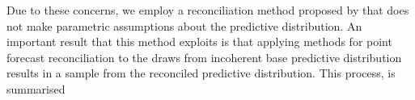 \documentclass[graybox]{svmult}
\begin{document}


Due to these concerns, we employ a reconciliation method proposed by \cite{GamEtAl2018} that does not make parametric assumptions about the predictive distribution.  An important result that this method exploits is that applying methods for point forecast reconciliation to the draws from incoherent base predictive distribution results in a sample from the reconciled predictive distribution. This process, is summarised

\end{document}
